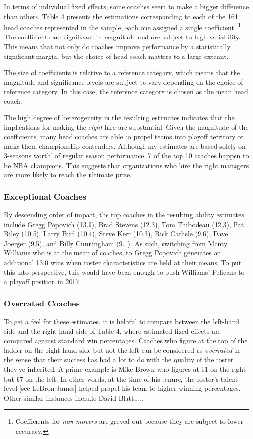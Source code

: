 In terms of individual fixed effects, some coaches seem to make a bigger difference than others. Table 4 presents the estimations corresponding to each of the 164 head coaches represented in the sample, each one assigned a single coefficient. \footnote{Coefficients for \textit{non-movers} are greyed-out because they are subject to lower accuracy.} The coefficients are significant in magnitude and are subject to high variability. This means that not only do coaches improve performance by a statistically significant margin, but the choice of head coach matters to a large extennt. 

The size of coefficients is relative to a reference category, which means that the magnitude and significance levels are subject to vary depending on the choice of reference category. In this case, the reference category is chosen as the mean head coach. 

The high degree of heterogeneity in the resulting estimates indicates that the implications for making the \textit{right} hire are substantial. Given the magnitude of the coefficients, many head coaches are able to propel teams into playoff territory or make them championship contenders. Although my estimates are based solely on 3-seasons worth' of regular season performance, 7 of the top 10 coaches happen to be NBA champions. This suggests that organizations who hire the right managers are more likely to reach the ultimate prize. 

\subsubsection{Exceptional Coaches}

By descending order of impact, the top coaches in the resulting ability estimates include Gregg Popovich (13.0), Brad Stevens (12.3), Tom Thibodeau (12.3), Pat Riley (10.5), Larry Bird (10.4), Steve Kerr (10.3), Rick Carlisle (9.6), Dave Joerger (9.5), and Billy Cunningham (9.1). As such, switching from Monty Williams who is at the mean of coaches,  to Gregg Popovich generates an additional 13.0 wins when roster characteristics are held at their means. To put this into perspective, this would have been enough to push Williams’ Pelicans to a playoff position in 2017.

\subsubsection{Overrated Coaches}

To get a feel for these estimates, it is helpful to compare between the left-hand side and the right-hand side of Table 4, where estimated fixed effects are compared against standard win percentages. Coaches who figure at the top of the ladder on the right-hand side but not the left can be considered as \textit{overrated} in the sense that their success has had a lot to do with the quality of the roster they've inherited. A prime example is Mike Brown who figures at 11 on the right but 67 on the left. In other words, at the time of his tenure, the roster's talent level [see LeBron James] helped propel his team to higher winning percentages. Other similar instances include David Blatt,....

